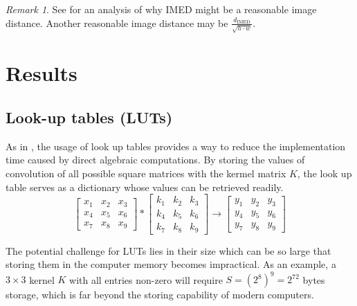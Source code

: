 \documentclass[12pt]{amsart}
\theoremstyle{definition}
\theoremstyle{remark}
\newtheorem{rem}[thm]{Remark}
\numberwithin{thm}{section}
\begin{document}
\begin{rem}
See \cite{FWZ05} for an analysis of why IMED might be a reasonable image distance. Another reasonable image distance may be $\frac{d_\text{IMED}}{\sqrt{h\cdot w}}$.
\end{rem}



\section{Results}

\subsection{Look-up tables (LUTs)}
As in \cite{WSLQE06}, 
the usage of look up tables %
provides a way to reduce the implementation time caused by direct algebraic computations. By storing the values of convolution of all possible square matrices with the kermel matrix $K$, the look up table serves as a dictionary whose values can be retrieved readily.  
$$
\begin{bmatrix}
x_1 & x_2 & x_3\\
x_4 & x_5 & x_6\\
x_7 & x_8 & x_9
\end{bmatrix}
*
\begin{bmatrix}
k_1 & k_2 & k_3\\
k_4 & k_5 & k_6\\
k_7 & k_8 & k_9
\end{bmatrix}
\longrightarrow
\begin{bmatrix}
y_1 & y_2 & y_3\\
y_4 & y_5 & y_6\\
y_7 & y_8 & y_9
\end{bmatrix}
$$

The potential challenge for LUTs lies in their size which can be so large that storing them in the computer memory becomes impractical. As an example, a $3\times 3$ kernel $K$ with all entries non-zero will require $S=(2^8)^9=2^{72}$ bytes storage, which is far beyond the storing capability of modern computers.
\end{document}
